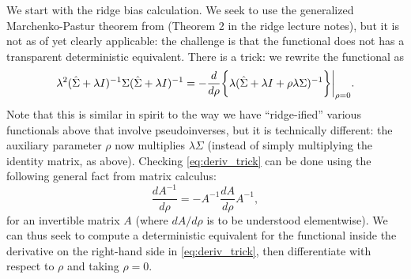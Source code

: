 \documentclass{article}
\begin{document}
We start with the ridge bias calculation. We seek to use the generalized
Marchenko-Pastur theorem from \citet{rubio2011spectral} (Theorem 2 in the ridge
lecture notes), but it is not as of yet clearly applicable: the challenge is
that the functional  does not has a transparent deterministic equivalent. There
is a trick: we rewrite the functional as
\begin{equation}
\label{eq:deriv_trick}
\lambda^2 (\hat\Sigma + \lambda I)^{-1} \Sigma (\hat\Sigma + \lambda I)^{-1} = 
-\frac{d}{d\rho} \bigg\{ \lambda (\hat\Sigma + \lambda I + \rho \lambda 
\Sigma)^{-1} \bigg\} \bigg|_{\rho=0}.  
\end{equation}
Note that this is similar in spirit to the way we have ``ridge-ified'' various
functionals above that involve pseudoinverses, but it is technically different:
the auxiliary parameter $\rho$ now multiplies $\lambda \Sigma$ (instead of simply
multiplying the identity matrix, as above). Checking \eqref{eq:deriv_trick} can
be done using the following general fact from matrix calculus: 
\[
\frac{dA^{-1}}{d\rho} = - A^{-1} \frac{dA}{d\rho} A^{-1},
\]
for an invertible matrix $A$ (where $dA/d\rho$ is to be understood
elementwise). We can thus seek to compute a deterministic equivalent for the
functional inside the derivative on the right-hand side in
\eqref{eq:deriv_trick}, then differentiate with respect to $\rho$ and taking 
$\rho=0$. 
\end{document}
